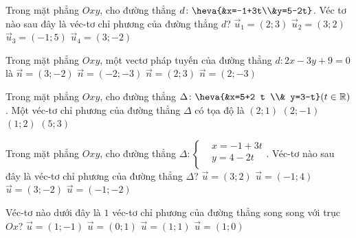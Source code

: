 \begin{ex}%
	Trong mặt phẳng $Oxy$, cho đường thẳng $d\colon\heva{&x=-1+3t\\&y=5-2t}$. Véc tơ nào sau đây là  véc-tơ chỉ phương của đường thẳng $d$?
	 \choice
		{$\overrightarrow{u}_1=(2;3)$} 
		 {$\overrightarrow{u}_2=(3;2)$}
		 {$\overrightarrow{u}_3=(-1;5)$}
		 {\True $\overrightarrow{u}_4=(3;-2)$}
\end{ex}

\begin{ex}%
	Trong mặt phẳng $O x  y$, một vectơ pháp tuyến của đường thẳng $d\colon2 x-3 y+9=0$ là
	\choice 
		{$\overrightarrow{n}=(3;-2)$} 
		{$\overrightarrow{n}=(-2;-3)$} 
		 {$\overrightarrow{n}=(2; 3)$}
		 {\True $\overrightarrow{n}=(2;-3)$}
\end{ex}

\begin{ex}%
	 Trong mặt phẳng $Oxy$, cho đường thẳng $\Delta\colon\heva{&x=5+2 t \\& y=3-t}(t \in \mathbb{R})$. Một véc-tơ chỉ phương của đường thẳng $\Delta$ có tọa độ là
	\choice 
		 {$(2; 1)$}
		 {\True $(2; -1)$}
		{$(1; 2)$} 
		 {$(5; 3)$}
\end{ex}

\begin{ex}%
	Trong mặt phẳng $Oxy$, cho đường thẳng $\Delta \colon \left\{\begin{aligned}
	 & x=-1+3t\\ & y=4-2t\\
\end{aligned}\right.$. Véc-tơ nào sau đây là véc-tơ chỉ phương của đường thẳng $\Delta$?
 \choice
	 {$\overrightarrow{u}=(3;2)$}
	 {$\overrightarrow{u}=(-1;4)$}
	 {\True $\overrightarrow{u}=(3;-2)$}
	{$\overrightarrow{u}=(-1;-2)$} 
\end{ex}

\begin{ex}%
	Véc-tơ nào dưới  đây là $1$ véc-tơ chỉ phương của đường thẳng song song với trục $Ox$?
	\choice 
		 {$\overrightarrow{u}=(1;-1)$}
		 {$\overrightarrow{u}=(0;1)$}
		{$\overrightarrow{u}=(1;1)$} 
		{\True  $\overrightarrow{u}=(1;0)$}
\end{ex}
